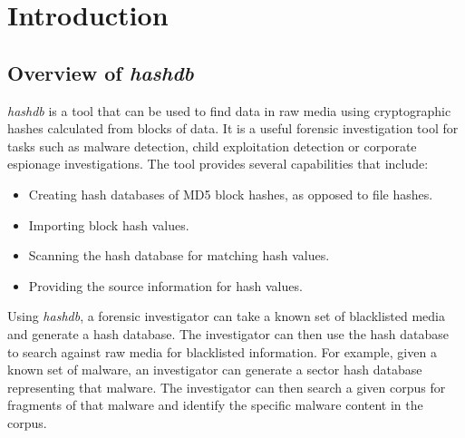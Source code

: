\documentclass[11pt,fleqn]{article} %
\begin{document}
\newcommand \hdb {\textit{hashdb}\xspace}
\newcommand \sscope {\textit{SectorScope}\xspace}
\newcommand \aut {\textbf{Autopsy}\xspace}
\newcommand \bulk {\textbf{bulk\_extractor}\xspace}





\setlength{\parindent}{0pt} %
\newpage
\thispagestyle{empty}
\mbox{}
\newpage


\tableofcontents
\newpage
{}





\newpage

\section{Introduction}
\subsection {Overview of \hdb}
\hdb is a tool that can be used to find data in raw media using cryptographic hashes calculated from blocks of data. It is a useful forensic investigation tool for tasks such as malware detection, child exploitation detection or corporate espionage investigations. The tool provides several capabilities that include:
\begin{itemize}
\item Creating hash databases of MD5 block hashes, as opposed to file hashes.
\item Importing block hash values.
\item Scanning the hash database for matching hash values.
\item Providing the source information for hash values. 
\end{itemize}

Using \hdb, a forensic investigator can take a known set of blacklisted media and generate a hash database. The investigator can then use the hash database to search against raw media for blacklisted information. For example, given a known set of malware, an investigator can generate a sector hash database representing that malware. The investigator can then search a given corpus for fragments of that malware and identify the specific malware content in the corpus.\\
\end{document}

